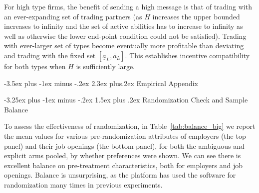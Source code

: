 \documentclass[12pt]{article}
\makeatletter
\renewcommand{\section}{%
  \@startsection{section}{1}{\z@}%
  {-3.5ex plus -1ex minus -.2ex}%
  {2.3ex plus.2ex}%
  {\normalfont\Large\bfseries}%
}
\renewcommand{\subsection}{%
  \@startsection{subsection}{2}{\z@}%
  {-3.25ex plus -1ex minus -.2ex}%
  {1.5ex plus .2ex}%
  {\normalfont\large\bfseries}%
}
\makeatother
\begin{document}
For high type firms, the benefit of sending a high message is that  of trading with an ever-expanding set of trading partners (as $H$ increases the upper bounded increases to infinity and the set of active abilities has to increase to infinity as well as otherwise the lower end-point condition could not be satisfied). Trading with ever-larger set of types become eventually more profitable than deviating and trading with the fixed set $\left[\underline{a}_L,\bar{a}_L\right]$. This establishes incentive compatibility for both types when $H$ is sufficiently large. 

\bigskip


\section{Empirical Appendix}


\subsection{Randomization Check and Sample Balance} 
\label{online_app:balance}

To assess the effectiveness of randomization, in Table~\ref{tab:balance_big} we report the mean values for various pre-randomization attributes of employers (the top panel) and their job openings (the bottom panel), for both the ambiguous and explicit arms pooled, by whether preferences were shown.
We can see there is excellent balance on pre-treatment characteristics, both for employers and job openings.
Balance is unsurprising, as the platform has used the software for randomization many times in previous experiments.
\end{document}
